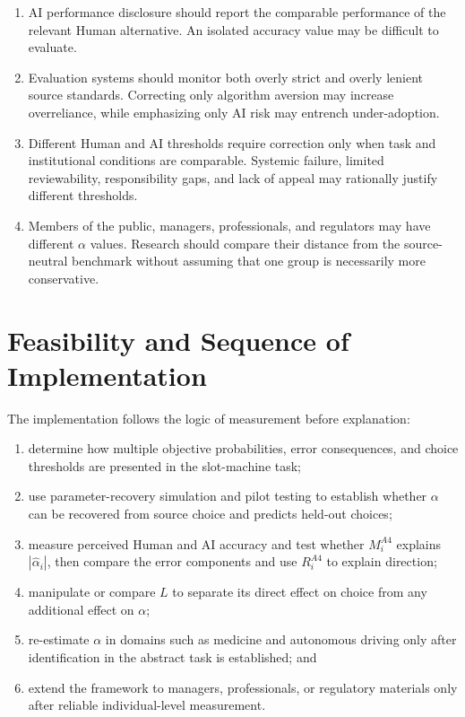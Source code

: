 \documentclass[11pt,a4paper]{article}
\begin{document}
\begin{enumerate}
\item AI performance disclosure should report the comparable performance of the relevant Human alternative. An isolated accuracy value may be difficult to evaluate.
\item Evaluation systems should monitor both overly strict and overly lenient source standards. Correcting only algorithm aversion may increase overreliance, while emphasizing only AI risk may entrench under-adoption.
\item Different Human and AI thresholds require correction only when task and institutional conditions are comparable. Systemic failure, limited reviewability, responsibility gaps, and lack of appeal may rationally justify different thresholds.
\item Members of the public, managers, professionals, and regulators may have different $\alpha$ values. Research should compare their distance from the source-neutral benchmark without assuming that one group is necessarily more conservative.
\end{enumerate}

\section{Feasibility and Sequence of Implementation}

The implementation follows the logic of measurement before explanation:

\begin{enumerate}
\item determine how multiple objective probabilities, error consequences, and choice thresholds are presented in the slot-machine task;
\item use parameter-recovery simulation and pilot testing to establish whether $\alpha$ can be recovered from source choice and predicts held-out choices;
\item measure perceived Human and AI accuracy and test whether $M_i^{A4}$ explains $|\widehat\alpha_i|$, then compare the error components and use $R_i^{A4}$ to explain direction;
\item manipulate or compare $L$ to separate its direct effect on choice from any additional effect on $\alpha$;
\item re-estimate $\alpha$ in domains such as medicine and autonomous driving only after identification in the abstract task is established; and
\item extend the framework to managers, professionals, or regulatory materials only after reliable individual-level measurement.
\end{enumerate}
\end{document}
